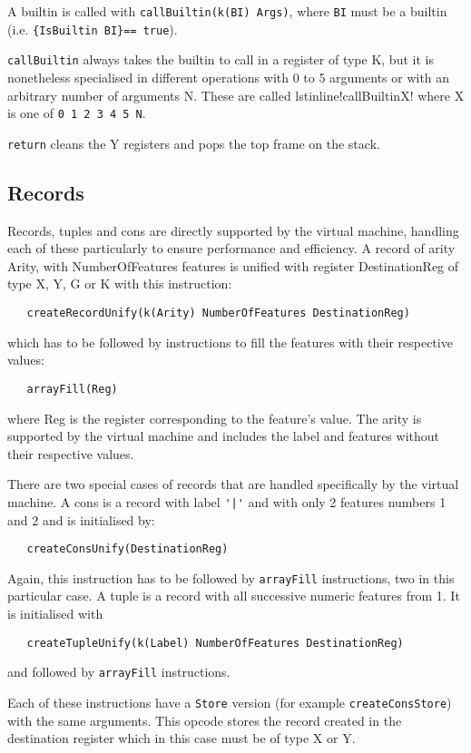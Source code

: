 \documentclass[a4paper]{memoir}
\begin{document}
A builtin is called with \lstinline!callBuiltin(k(BI) Args)!, where
\lstinline!BI! must be a builtin (i.e. \lstinline!{IsBuiltin BI}== true!).

\lstinline!callBuiltin! always takes the builtin to call in a register of type
K, but it is nonetheless specialised in different operations with 0 to 5
arguments or with an arbitrary number of arguments N. These are called
lstinline!callBuiltinX! where X is one of \lstinline!0 1 2 3 4 5 N!.

\lstinline!return! cleans the Y registers and pops the top frame on the stack.


\subsection{Records}\label{sec:opcode:records}
Records, tuples and cons are directly supported by the virtual machine, handling each of these particularly to ensure performance and efficiency.
A record of arity Arity, with NumberOfFeatures features is unified with register
DestinationReg of type X, Y, G or K with this instruction:
\begin{lstlisting}
   createRecordUnify(k(Arity) NumberOfFeatures DestinationReg)
\end{lstlisting}
which has to be followed by instructions to fill the features with their respective values:
\begin{lstlisting}
   arrayFill(Reg)
\end{lstlisting}
 where Reg is the register corresponding to the feature's value.
The arity is supported by the virtual machine and includes the label and features without their respective values.

There are two special cases of records that are handled specifically by the virtual machine.
A cons is a record with label \lstinline!'|'! and with only 2 features numbers 1
and 2 and is initialised by:
\begin{lstlisting}
   createConsUnify(DestinationReg)
\end{lstlisting}
Again, this instruction has to be
followed by \lstinline!arrayFill! instructions, two in this particular case.
A tuple is a record with all successive numeric features from 1. It is initialised with 
\begin{lstlisting}
   createTupleUnify(k(Label) NumberOfFeatures DestinationReg)
\end{lstlisting}
and followed by \lstinline!arrayFill! instructions.

Each of these instructions have a \lstinline!Store! version (for example
\lstinline!createConsStore!) with the same arguments. This opcode stores the
record created in the destination register which in this case must be of type X
or Y.
\end{document}
